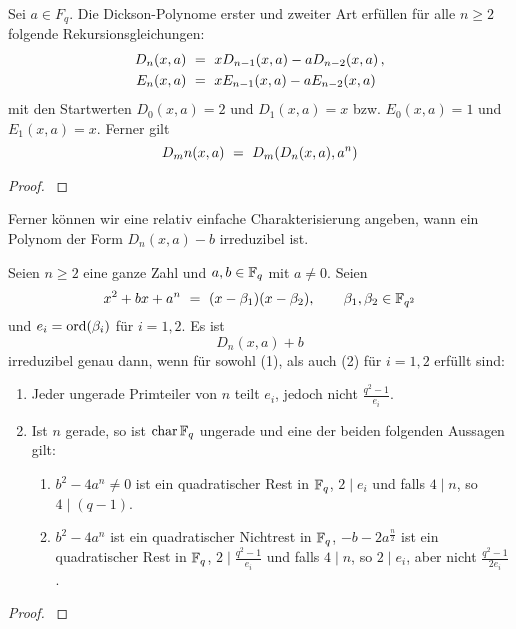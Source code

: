 \begin{satz}
  \label{satz:dickson_2}
  Sei $a \in F_q$. Die Dickson-Polynome erster und zweiter Art 
  erfüllen für alle $n\geq 2$ folgende Rekursionsgleichungen:
  \begin{align*}
    D_n(x,a) &\ =\  xD_{n-1}(x,a) - a D_{n-2}(x,a) \,, \\
    E_n(x,a) &\ =\  xE_{n-1}(x,a) - a E_{n-2}(x,a)
  \end{align*}
  mit den Startwerten $D_0(x,a) = 2$ und $D_1(x,a)=x$ bzw.
  $E_0(x,a) = 1$ und $E_1(x,a) = x$. Ferner gilt
  \[ D_mn(x,a) \ =\  D_m(D_n(x,a),a^n)\]
\end{satz}
\begin{proof}
  \autocite{??}
\end{proof}

Ferner können wir eine  relativ einfache Charakterisierung angeben, wann ein
Polynom der Form $D_n(x,a)-b$ irreduzibel ist.

\begin{satz}
  \label{satz:dickson_irred}
  Seien $n\geq 2$ eine ganze Zahl und $a,b \in \mathbb{F}_q$ mit $a \neq 0$.
  Seien
  \[ x^2 + bx +a^n \ =\  (x-\beta_1)(x-\beta_2), \qquad 
    \beta_1,\beta_2 \in \mathbb{F}_{q^2}\]
  und $e_i = \operatorname{ord}(\beta_i)$ für $i=1,2$. Es ist
  \[ D_n(x,a) + b \]
  irreduzibel genau dann, wenn für sowohl (1), als auch (2) für $i=1,2$ erfüllt
  sind:
  \begin{enumerate}
    \item Jeder ungerade Primteiler von $n$ teilt $e_i$, jedoch nicht
      $\tfrac{q^2-1}{e_i}$.
    \item Ist $n$ gerade, so ist $\operatorname{char} \mathbb{F}_q$ ungerade und eine der beiden
      folgenden Aussagen gilt:
      \begin{enumerate}[label=(\arabic*')]
        \item $b^2-4a^n \neq 0$ ist ein quadratischer Rest in $\mathbb{F}_q$, $2\mid e_i$
          und falls $4\mid n$, so $4 \mid (q-1)$.
        \item $b^2-4a^n$ ist ein quadratischer Nichtrest in $\mathbb{F}_q$,
          $-b-2a^\frac n 2$ ist ein quadratischer Rest in $\mathbb{F}_q$, 
          $2 \mid \tfrac{q^2-1}{e_i}$ und falls $4\mid n$, so $2\mid e_i$, 
          aber nicht $\tfrac{q^2-1}{2e_i}$.
      \end{enumerate}
  \end{enumerate}
\end{satz}
\begin{proof}
  \autocite[Theorem 4]{gao1994}
\end{proof}


